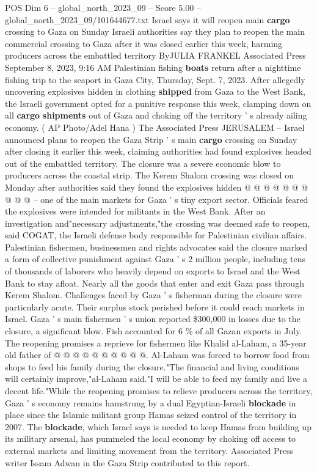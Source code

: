 \begin{textsample}{POS Dim 6 – global\_north\_2023\_09 – Score 5.00 – global\_north\_2023\_09/101644677.txt}  \label{ex:f6_pos_102}
Israel says it will reopen main \textbf{cargo} crossing to Gaza on Sunday Israeli authorities say they plan to reopen the main commercial crossing to Gaza after it was closed earlier this week, harming producers across the embattled territory ByJULIA FRANKEL Associated Press September 8, 2023, 9:16 AM Palestinian fishing \textbf{boats} return after a nighttime fishing trip to the seaport in Gaza City, Thursday, Sept. 7, 2023.
After allegedly uncovering explosives hidden in clothing \textbf{shipped} from Gaza to the West Bank, the Israeli government opted for a punitive response this week, clamping down on all \textbf{cargo} \textbf{shipments} out of Gaza and choking off the territory ' s already ailing economy. ( AP Photo/Adel Hana ) The Associated Press JERUSALEM -- Israel announced plans to reopen the Gaza Strip ' s main \textbf{cargo} crossing on Sunday after closing it earlier this week, claiming authorities had found explosives headed out of the embattled territory.
The closure was a severe economic blow to producers across the coastal strip.
The Kerem Shalom crossing was closed on Monday after authorities said they found the explosives hidden @ @ @ @ @ @ @ @ @ @ -- one of the main markets for Gaza ' s tiny export sector.
Officials feared the explosives were intended for militants in the West Bank.
After an investigation and"necessary adjustments,"the crossing was deemed safe to reopen, said COGAT, the Israeli defense body responsible for Palestinian civilian affairs.
Palestinian fishermen, businessmen and rights advocates said the closure marked a form of collective punishment against Gaza ' s 2 million people, including tens of thousands of laborers who heavily depend on exports to Israel and the West Bank to stay afloat.
Nearly all the goods that enter and exit Gaza pass through Kerem Shalom.
Challenges faced by Gaza ' s fisherman during the closure were particularly acute.
Their surplus stock perished before it could reach markets in Israel.
Gaza ' s main fishermen ' s union reported \$300,000 in losses due to the closure, a significant blow.
Fish accounted for 6 \% of all Gazan exports in July.
The reopening promises a reprieve for fishermen like Khalid al-Laham, a 35-year old father of @ @ @ @ @ @ @ @ @ @.
Al-Laham was forced to borrow food from shops to feed his family during the closure."The financial and living conditions will certainly improve,"al-Laham said."I will be able to feed my family and live a decent life."While the reopening promises to relieve producers across the territory, Gaza ' s economy remains hamstrung by a dual Egyptian-Israeli \textbf{blockade} in place since the Islamic militant group Hamas seized control of the territory in 2007.
The \textbf{blockade}, which Israel says is needed to keep Hamas from building up its military arsenal, has pummeled the local economy by choking off access to external markets and limiting movement from the territory.
Associated Press writer Issam Adwan in the Gaza Strip contributed to this report.

\end{textsample}

